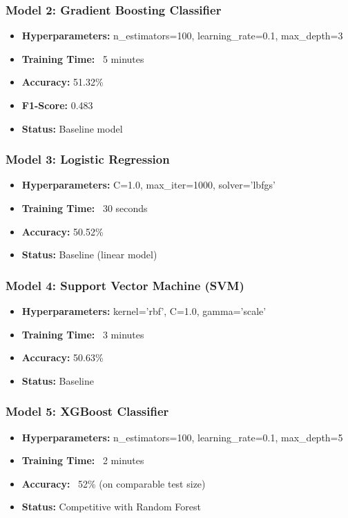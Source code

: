 \subsubsection{Model 2: Gradient Boosting Classifier}
\begin{itemize}
    \item \textbf{Hyperparameters:} n\_estimators=100, learning\_rate=0.1, max\_depth=3
    \item \textbf{Training Time:} ~5 minutes
    \item \textbf{Accuracy:} 51.32\%
    \item \textbf{F1-Score:} 0.483
    \item \textbf{Status:} Baseline model
\end{itemize}

\subsubsection{Model 3: Logistic Regression}
\begin{itemize}
    \item \textbf{Hyperparameters:} C=1.0, max\_iter=1000, solver='lbfgs'
    \item \textbf{Training Time:} ~30 seconds
    \item \textbf{Accuracy:} 50.52\%
    \item \textbf{Status:} Baseline (linear model)
\end{itemize}

\subsubsection{Model 4: Support Vector Machine (SVM)}
\begin{itemize}
    \item \textbf{Hyperparameters:} kernel='rbf', C=1.0, gamma='scale'
    \item \textbf{Training Time:} ~3 minutes
    \item \textbf{Accuracy:} 50.63\%
    \item \textbf{Status:} Baseline
\end{itemize}

\subsubsection{Model 5: XGBoost Classifier}
\begin{itemize}
    \item \textbf{Hyperparameters:} n\_estimators=100, learning\_rate=0.1, max\_depth=5
    \item \textbf{Training Time:} ~2 minutes
    \item \textbf{Accuracy:} ~52\% (on comparable test size)
    \item \textbf{Status:} Competitive with Random Forest
\end{itemize}

